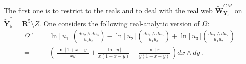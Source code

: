 \documentclass[11pt]{amsart}
\begin{document}
 The first one is to restrict to the reals and to deal with the real web  $\widetilde{\boldsymbol{W}}^{GM}_{\boldsymbol{Y}_5}$ on $\widetilde{\boldsymbol{Y}}_5^*=\mathbf R^5\setminus Z$. One considers the following real-analytic version of $\Omega$: 
 \begin{align*}
  \Omega^\omega= &\, 
 \ln  {\big| \,\mathit{u_1}\,  \big|} \left( 
\frac{ \mathit{du_2} \wedge  \mathit{du_3}
}{\mathit{u_2} \mathit{u_3}}
\right) 
-\ln  {\big | \,\mathit{u_2}\,  \big|} \left( 
\frac{ \mathit{du_1} \wedge  \mathit{du_3}
}{\mathit{u_1} \mathit{u_3}}
\right) 
+
\ln  {\big | \,  \mathit{u_3} \, \big |} \left( 
\frac{ \mathit{du_1} \wedge  \mathit{du_2}
}{\mathit{u_1} \mathit{u_2}}
\right) 
\\
=
& \, 
\left( \, 
\frac{\ln  \,\lvert \,1+x-y\,\lvert}{xy}
+\frac{\ln  \,\lvert \,y\,\lvert }{x(1+x-y) }
-\frac{\ln  \,\lvert \,x\, \lvert }{y(1+x-y) }
\, \right) dx\wedge dy\, . 
 \end{align*}
 
\end{document}
